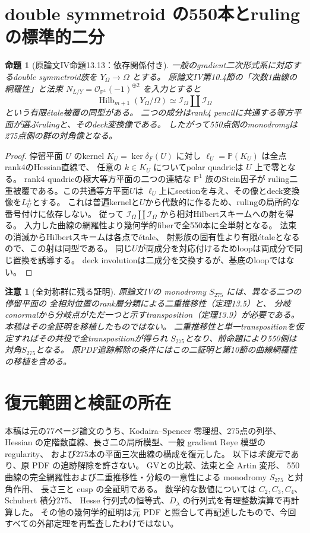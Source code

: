 \documentclass[11pt,a4paper]{ltjsarticle}
\newtheorem{proposition}[theorem]{命題}
\newtheorem{remark}[theorem]{注意}
\newcommand{\PP}{\mathbb P}
\newcommand{\OO}{\mathcal O}
\newcommand{\Hilb}{\operatorname{Hilb}}
\begin{document}
\section{double symmetroid の550本とrulingの標準的二分}
\begin{proposition}[原論文IV命題13.13：依存関係付き]\label{prop:reye-550-restored}
一般のgradient二次形式系に対応するdouble symmetroid族を
$Y_\Omega\to\Omega$ とする。
原論文IV第10.4節の「次数1曲線の網羅性」と法束
$N_{L/Y}=\OO_{\PP^1}(-1)^{\oplus2}$ を入力とすると
\[
 \Hilb_{m+1}(Y_\Omega/\Omega)\simeq
 \mathcal I_\Omega\amalg\mathcal I_\Omega
\]
という有限étale被覆の同型がある。
二つの成分はrank4 pencilに共通する等方平面が選ぶrulingと、そのdeck変換像である。
したがって550点側のmonodromyは275点側の群の対角像となる。
\end{proposition}
\begin{proof}
停留平面 $U$ のkernel $K_U=\ker\delta_F(U)$ に対し
$\ell_U=\PP(K_U)$ は全点rank4のHessian直線で、
任意の $k\in K_U$ についてpolar quadricは $U$ 上で零となる。
rank4 quadricの極大等方平面の二つの連結な $\PP^1$ 族のStein因子が
ruling二重被覆である。この共通等方平面$U$は
$\ell_U$上にsectionを与え、その像とdeck変換像を$L_U^\pm$とする。
これは普遍kernelと$U$から代数的に作るため、rulingの局所的な番号付けに依存しない。
従って $\mathcal I_\Omega\amalg\mathcal I_\Omega$ から相対Hilbertスキームへの射を得る。
入力した曲線の網羅性より幾何学的fiberで全550本に全単射となる。
法束の消滅からHilbertスキームは各点でétale、
射影族の固有性より有限étaleとなるので、この射は同型である。
同じ$U$が両成分を対応付けるためloopは両成分で同じ置換を誘導する。
deck involutionは二成分を交換するが、基底のloopではない。
\end{proof}

\begin{remark}[全対称群に残る証明]
原論文IVの monodromy $S_{275}$ には、異なる二つの停留平面の
全相対位置のrank層分類による二重推移性（定理13.5）と、
分岐conormalから分岐点がただ一つと示すtransposition（定理13.9）が必要である。
本稿はその全証明を移植したものではない。
二重推移性と単一transpositionを仮定すればその共役で全transpositionが得られ
$S_{275}$となり、前命題により550側は対角$S_{275}$となる。
原PDF追跡解除の条件にはこの二証明と第10節の曲線網羅性の移植を含める。
\end{remark}

\section{復元範囲と検証の所在}
本稿は元の77ページ論文のうち、Kodaira--Spencer 零理想、275点の列挙、
Hessian の定階数直線、長さ二の局所模型、一般 gradient Reye 模型の regularity、
および275本の平面三次曲線の構成を復元した。
以下は\emph{未復元}であり、原 PDF の追跡解除を許さない。
GVとの比較、法束と全 Artin 変形、
550曲線の完全網羅性および二重推移性・分岐の一意性による monodromy $S_{275}$ と対角作用、
長さ三と cusp の全証明である。
数学的な数値については $C_2,C_3,C_4$、Schubert 積分275、
Hesse 行列式の恒等式、$D_\lambda$ の行列式を有理整数演算で再計算した。
その他の幾何学的証明は元 PDF と照合して再記述したもので、今回すべての外部定理を再監査したわけではない。
\end{document}
